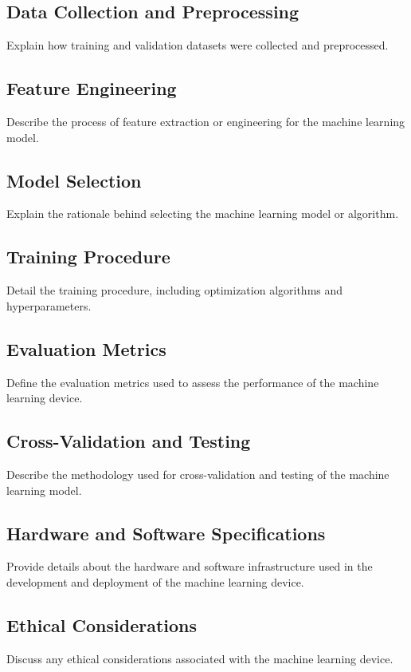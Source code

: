\documentclass[a4paper, 12pt]{report}
\begin{document}
\subsection{Data Collection and Preprocessing}
Explain how training and validation datasets were collected and preprocessed.

\subsection{Feature Engineering}
Describe the process of feature extraction or engineering for the machine learning model.

\subsection{Model Selection}
Explain the rationale behind selecting the machine learning model or algorithm.

\subsection{Training Procedure}
Detail the training procedure, including optimization algorithms and hyperparameters.

\subsection{Evaluation Metrics}
Define the evaluation metrics used to assess the performance of the machine learning device.

\subsection{Cross-Validation and Testing}
Describe the methodology used for cross-validation and testing of the machine learning model.

\subsection{Hardware and Software Specifications}
Provide details about the hardware and software infrastructure used in the development and deployment of the machine learning device.

\subsection{Ethical Considerations}
Discuss any ethical considerations associated with the machine learning device.
\end{document}
